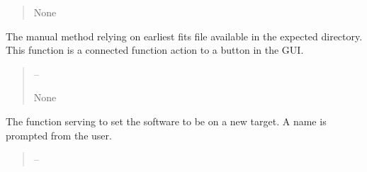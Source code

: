 \documentclass[letterpaper,11pt,english]{sphinxmanual}
\begin{document}
\begin{savenotes}
\begin{fulllineitems}
\begin{savenotes}
\begin{fulllineitems}
\begin{quote}
\begin{description}
\sphinxAtStartPar
None

\end{description}\end{quote}

\end{fulllineitems}\end{savenotes}


\begin{savenotes}\begin{fulllineitems}
\label{\detokenize{code/opihiexarata.gui.manual:opihiexarata.gui.manual.OpihiManualWindow.__connect_push_button_new_image_manual}}
\pysigstartsignatures
{}
\pysigstopsignatures
\sphinxAtStartPar
The manual method relying on earliest fits file available in
the expected directory. This function is a connected function action to
a button in the GUI.
\begin{quote}\begin{description}
\sphinxAtStartPar
{} – 

\sphinxAtStartPar
None

\end{description}\end{quote}

\end{fulllineitems}\end{savenotes}


\begin{savenotes}\begin{fulllineitems}
\label{\detokenize{code/opihiexarata.gui.manual:opihiexarata.gui.manual.OpihiManualWindow.__connect_push_button_new_target}}
\pysigstartsignatures
{}
\pysigstopsignatures
\sphinxAtStartPar
The function serving to set the software to be on a new target.
A name is prompted from the user.
\begin{quote}\begin{description}
\sphinxAtStartPar
{} – 


\end{description}
\end{quote}
\end{fulllineitems}
\end{savenotes}
\end{fulllineitems}
\end{savenotes}
\end{document}
